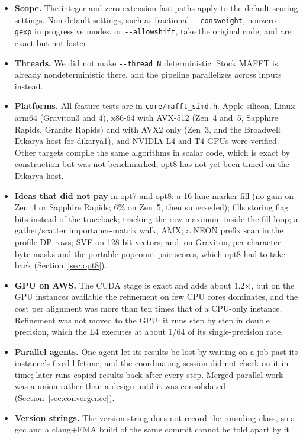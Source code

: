 \documentclass[11pt]{article}
\newcommand{\code}[1]{\texttt{#1}}
\begin{document}
\begin{itemize}
\item \textbf{Scope.} The integer and zero-extension fast paths apply to the default
  scoring settings. Non-default settings, such as fractional \code{-{}-consweight},
  nonzero \code{-{}-gexp} in progressive modes, or \code{-{}-allowshift}, take the original
  code, and are exact but not faster.
\item \textbf{Threads.} We did not make \code{-{}-thread N} deterministic. Stock MAFFT is
  already nondeterministic there, and the pipeline parallelizes across inputs instead.
\item \textbf{Platforms.} All feature tests are in \code{core/mafft\_simd.h}. Apple silicon,
  Linux arm64 (Graviton3 and 4), x86-64 with AVX-512 (Zen~4 and~5, Sapphire Rapids, Granite
  Rapids) and with AVX2 only (Zen~3, and the Broadwell Dikarya host for dikarya1), and NVIDIA L4
  and T4 GPUs were verified. Other targets compile the same algorithms in scalar code, which is
  exact by construction but was not benchmarked; opt8 has not yet been timed on the Dikarya host.
\item \textbf{Ideas that did not pay} in opt7 and opt8: a 16-lane marker fill (no gain on Zen~4 or
  Sapphire Rapids; 6\% on Zen~5, then superseded); fills storing flag bits instead of the
  traceback; tracking the row maximum inside the fill loop; a gather/scatter importance-matrix
  walk; AMX; a NEON prefix scan in the profile-DP rows; SVE on 128-bit vectors; and, on Graviton,
  per-character byte masks and the portable popcount pair scores, which opt8 had to take back
  (Section~\ref{sec:opt8}).
\item \textbf{GPU on AWS.} The CUDA stage is exact and adds about 1.2$\times$, but on the GPU
  instances available the refinement on few CPU cores dominates, and the cost per alignment was
  more than ten times that of a CPU-only instance. Refinement was not moved to the GPU: it runs
  step by step in double precision, which the L4 executes at about 1/64 of its single-precision
  rate.
\item \textbf{Parallel agents.} One agent let its results be lost by waiting on a job past its
  instance's fixed lifetime, and the coordinating session did not check on it in time; later
  runs copied results back after every step. Merged parallel work was a union rather than a
  design until it was consolidated (Section~\ref{sec:convergence}).
\item \textbf{Version strings.} The version string does not record the rounding class, so a gcc
  and a clang+FMA build of the same commit cannot be told apart by it

\end{itemize}
\end{document}
